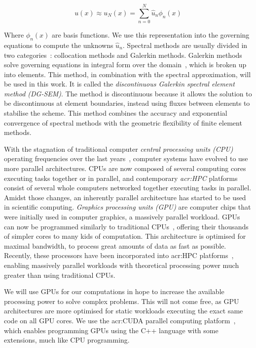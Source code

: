 \begin{equation}
	u(x) \approx u_N(x) = \sum_{n = 0}^{N} \widehat{u}_n \phi _n(x)
\end{equation}

Where $\phi _n(x)$ are basis functions. We use this representation into the governing equations to
compute the unknowns $\widehat{u}_n$. Spectral methods are usually divided in two
categories~\cite{Karniadakis2005}: collocation methods and Galerkin methods. Galerkin methods solve
governing equations in integral form over the domain~\cite{Reed1973}, which is broken up into
elements. This method, in combination with the spectral approximation, will be used in this work. It
is called the \textit{discontinuous Galerkin spectral element method (DG-SEM)}. The method is
discontinuous because it allows the solution to be discontinuous at element boundaries, instead
using fluxes between elements to stabilise the scheme. This method combines the accuracy and
exponential convergence of spectral methods with the geometric flexibility of finite element
methods. 

With the stagnation of traditional computer \textit{central processing units (CPU)} operating
frequencies over the last years~\cite{Parkhurst2006}, computer systems have evolved to use more
parallel architectures. CPUs are now composed of several computing cores~\cite{Nayfeh1997} executing
tasks together or in parallel, and contemporary \textit{\acrfull{acr:HPC}} platforms consist of
several whole computers networked together executing tasks in parallel. Amidst those changes, an
inherently parallel architecture has started to be used in scientific computing. \textit{Graphics
processing units (GPU)} are computer chips that were initially used in computer graphics, a
massively parallel workload. GPUs can now be programmed similarly to traditional
CPUs~\cite{Owens2008}, offering their thousands of simpler cores to many kids of computation. This
architecture is optimised for maximal bandwidth, to process great amounts of data as fast as
possible. Recently, these processors have been incorporated into \acrshort{acr:HPC}
platforms~\cite{Fan2004}, enabling massively parallel workloads with theoretical processing power
much greater than using traditional CPUs.

We will use GPUs for our computations in hope to increase the available processing power to solve
complex problems. This will not come free, as GPU architectures are more optimised for static
workloads executing the exact same code on all GPU cores. We use the \acrshort{acr:CUDA} parallel
computing platform~\cite{Garland2008}, which enables programming GPUs using the C++ language with
some extensions, much like CPU programming.

